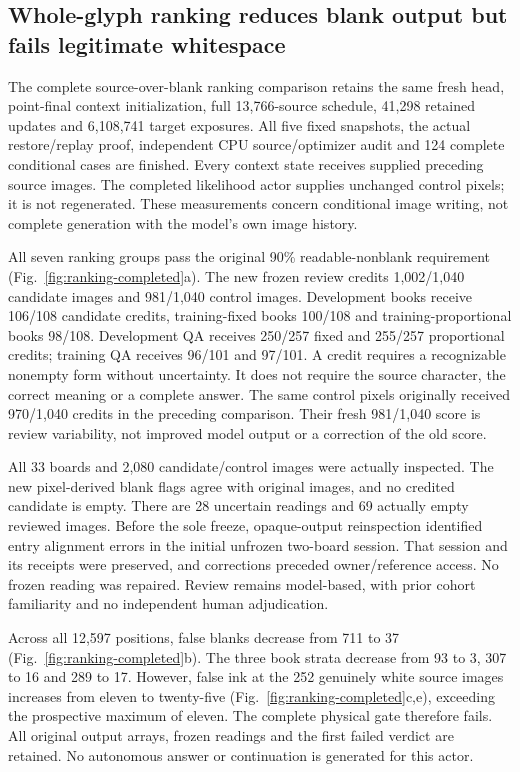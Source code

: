 \subsection*{Whole-glyph ranking reduces blank output but fails legitimate whitespace}

The complete source-over-blank ranking comparison retains the same fresh head,
point-final context initialization, full 13,766-source schedule, 41,298 retained
updates and 6,108,741 target exposures. All five fixed snapshots, the actual
restore/replay proof, independent CPU source/optimizer audit and 124 complete
conditional cases are finished. Every context state receives supplied preceding
source images. The completed likelihood actor supplies unchanged control pixels;
it is not regenerated. These measurements concern conditional image writing,
not complete generation with the model's own image history.

All seven ranking groups pass the original 90\% readable-nonblank requirement
(Fig.~\ref{fig:ranking-completed}a). The new frozen review credits 1,002/1,040
candidate images and 981/1,040 control images. Development books receive 106/108
candidate credits, training-fixed books 100/108 and training-proportional books
98/108. Development QA receives 250/257 fixed and 255/257 proportional credits;
training QA receives 96/101 and 97/101. A credit requires a recognizable nonempty
form without uncertainty. It does not require the source character, the correct
meaning or a complete answer. The same control pixels originally received
970/1,040 credits in the preceding comparison. Their fresh 981/1,040 score is
review variability, not improved model output or a correction of the old score.

All 33 boards and 2,080 candidate/control images were actually inspected.
The new pixel-derived blank flags agree with original images, and no credited
candidate is empty. There are 28 uncertain readings and 69 actually empty
reviewed images. Before the sole freeze, opaque-output reinspection identified
entry alignment errors in the initial unfrozen two-board session. That session
and its receipts were preserved, and corrections preceded owner/reference
access. No frozen reading was repaired. Review remains model-based, with prior
cohort familiarity and no independent human adjudication.

Across all 12,597 positions, false blanks decrease from 711 to 37
(Fig.~\ref{fig:ranking-completed}b). The three book strata decrease from
93 to 3, 307 to 16 and 289 to 17. However, false ink at the 252 genuinely
white source images increases from eleven to twenty-five
(Fig.~\ref{fig:ranking-completed}c,e), exceeding the prospective maximum of
eleven. The complete physical gate therefore fails. All original output
arrays, frozen readings and the first failed verdict are retained. No
autonomous answer or continuation is generated for this actor.

